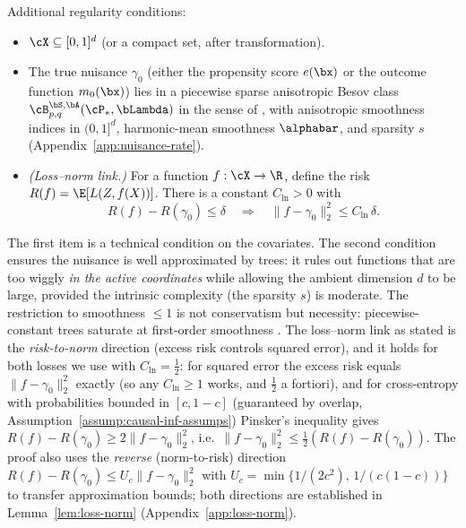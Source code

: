 \documentclass[12pt]{article}
\begin{document}
\begin{assumption}\label{assump:regularity}
Additional regularity conditions:
\begin{itemize}
\item  $\cX \subseteq [0,1]^d$ (or a compact set, after transformation).
\item The true nuisance $\gamma_0$ (either the propensity score $e(\bx)$ or the outcome function $m_0(\bx)$) lies in a piecewise sparse anisotropic Besov class $\cB^{\bS,\bA}_{p,q}(\cP_*, \bLambda)$ in the sense of \citet[Def.~4.5]{xuStatisticalOptimalityOptimal2026}, with anisotropic smoothness indices in $(0,1]^d$, harmonic-mean smoothness $\alphabar$, and sparsity $s$ (Appendix~\ref{app:nuisance-rate}).
\item \emph{(Loss--norm link.)} For a function $f: \cX \to \R$, define the risk $R(f) = \E[L(Z, f(X))]$. There is a constant $C_{\text{ln}} > 0$ with
\[
R(f) - R(\gamma_0) \le \delta \quad \Rightarrow \quad \|f - \gamma_0\|_2^2 \le C_{\text{ln}}\,\delta.
\]
\end{itemize}
\end{assumption}
The first item is a technical condition on the covariates. The second condition ensures the nuisance is well approximated by trees: it rules out functions that are too wiggly \emph{in the active coordinates} while allowing the ambient dimension $d$ to be large, provided the intrinsic complexity (the sparsity $s$) is moderate. The restriction to smoothness $\le 1$ is not conservatism but necessity: piecewise-constant trees saturate at first-order smoothness \citep[Remark~4.3]{xuStatisticalOptimalityOptimal2026}. The loss--norm link as stated is the \emph{risk-to-norm} direction (excess risk controls squared error), and it holds for both losses we use with $C_{\text{ln}} = \tfrac12$: for squared error the excess risk equals $\|f-\gamma_0\|_2^2$ exactly (so any $C_{\text{ln}}\ge1$ works, and $\tfrac12$ a fortiori), and for cross-entropy with probabilities bounded in $[c,1-c]$ (guaranteed by overlap, Assumption~\ref{assump:causal-inf-assumps}) Pinsker's inequality gives $R(f)-R(\gamma_0)\ge 2\|f-\gamma_0\|_2^2$, i.e.\ $\|f-\gamma_0\|_2^2 \le \tfrac12(R(f)-R(\gamma_0))$. The proof also uses the \emph{reverse} (norm-to-risk) direction $R(f)-R(\gamma_0)\le U_c\|f-\gamma_0\|_2^2$ with $U_c=\min\{1/(2c^2),\,1/(c(1-c))\}$ to transfer approximation bounds; both directions are established in Lemma~\ref{lem:loss-norm} (Appendix~\ref{app:loss-norm}).
\end{document}
